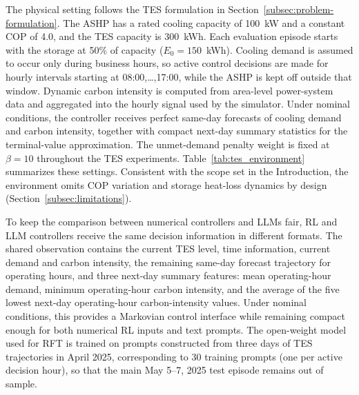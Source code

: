 \documentclass[11pt]{article}
\begin{document}
The physical setting follows the TES formulation in Section~\ref{subsec:problem-formulation}. The ASHP has a rated cooling capacity of 100~kW and a constant COP of 4.0, and the TES capacity is 300~kWh. Each evaluation episode starts with the storage at 50\% of capacity ($E_0=150$~kWh). Cooling demand is assumed to occur only during business hours, so active control decisions are made for hourly intervals starting at 08:00,\dots,17:00, while the ASHP is kept off outside that window. Dynamic carbon intensity is computed from area-level power-system data and aggregated into the hourly signal used by the simulator. Under nominal conditions, the controller receives perfect same-day forecasts of cooling demand and carbon intensity, together with compact next-day summary statistics for the terminal-value approximation. The unmet-demand penalty weight is fixed at $\beta=10$ throughout the TES experiments. Table~\ref{tab:tes_environment} summarizes these settings. Consistent with the scope set in the Introduction, the environment omits COP variation and storage heat-loss dynamics by design (Section~\ref{subsec:limitations}).

To keep the comparison between numerical controllers and LLMs fair, RL and LLM controllers receive the same decision information in different formats. The shared observation contains the current TES level, time information, current demand and carbon intensity, the remaining same-day forecast trajectory for operating hours, and three next-day summary features: mean operating-hour demand, minimum operating-hour carbon intensity, and the average of the five lowest next-day operating-hour carbon-intensity values. Under nominal conditions, this provides a Markovian control interface while remaining compact enough for both numerical RL inputs and text prompts. The open-weight model used for RFT is trained on prompts constructed from three days of TES trajectories in April 2025, corresponding to 30 training prompts (one per active decision hour), so that the main May 5--7, 2025 test episode remains out of sample.
\end{document}
